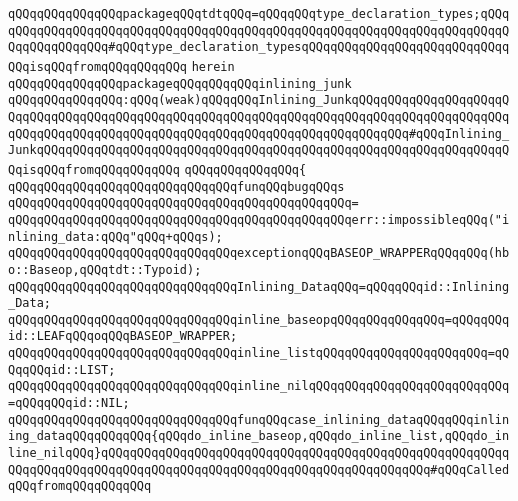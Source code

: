 \verb|qQQqqQQqqQQqqQQqpackageqQQqtdtqQQq=qQQqqQQqtype_declaration_types;qQQqqQQqqQQqqQQqqQQqqQQqqQQqqQQqqQQqqQQqqQQqqQQqqQQqqQQqqQQqqQQqqQQqqQQqqQQqqQQqqQQqqQQq#qQQqtype_declaration_typesqQQqqQQqqQQqqQQqqQQqqQQqqQQqqQQqisqQQqfromqQQqqQQqqQQq|\newline
\verb|herein|\newline
\newline
\verb|qQQqqQQqqQQqqQQqpackageqQQqqQQqqQQqinlining_junk|\newline
\verb|qQQqqQQqqQQqqQQq:qQQq(weak)qQQqqQQqInlining_JunkqQQqqQQqqQQqqQQqqQQqqQQqqQQqqQQqqQQqqQQqqQQqqQQqqQQqqQQqqQQqqQQqqQQqqQQqqQQqqQQqqQQqqQQqqQQqqQQqqQQqqQQqqQQqqQQqqQQqqQQqqQQqqQQqqQQqqQQqqQQqqQQqqQQq#qQQqInlining_JunkqQQqqQQqqQQqqQQqqQQqqQQqqQQqqQQqqQQqqQQqqQQqqQQqqQQqqQQqqQQqqQQqqQQqisqQQqfromqQQqqQQqqQQq|\newline
\verb|qQQqqQQqqQQqqQQq{|\newline
\verb|qQQqqQQqqQQqqQQqqQQqqQQqqQQqqQQqfunqQQqbugqQQqs|\newline
\verb|qQQqqQQqqQQqqQQqqQQqqQQqqQQqqQQqqQQqqQQqqQQqqQQq=|\newline
\verb|qQQqqQQqqQQqqQQqqQQqqQQqqQQqqQQqqQQqqQQqqQQqqQQqerr::impossibleqQQq("inlining_data:qQQq"qQQq+qQQqs);|\newline
\newline
\verb|qQQqqQQqqQQqqQQqqQQqqQQqqQQqqQQqexceptionqQQqBASEOP_WRAPPERqQQqqQQq(hbo::Baseop,qQQqtdt::Typoid);|\newline
\newline
\verb|qQQqqQQqqQQqqQQqqQQqqQQqqQQqqQQqInlining_DataqQQq=qQQqqQQqid::Inlining_Data;|\newline
\newline
\verb|qQQqqQQqqQQqqQQqqQQqqQQqqQQqqQQqinline_baseopqQQqqQQqqQQqqQQq=qQQqqQQqid::LEAFqQQqoqQQqBASEOP_WRAPPER;|\newline
\verb|qQQqqQQqqQQqqQQqqQQqqQQqqQQqqQQqinline_listqQQqqQQqqQQqqQQqqQQqqQQq=qQQqqQQqid::LIST;|\newline
\verb|qQQqqQQqqQQqqQQqqQQqqQQqqQQqqQQqinline_nilqQQqqQQqqQQqqQQqqQQqqQQqqQQq=qQQqqQQqid::NIL;|\newline
\newline
\verb|qQQqqQQqqQQqqQQqqQQqqQQqqQQqqQQqfunqQQqcase_inlining_dataqQQqqQQqinlining_dataqQQqqQQqqQQq{qQQqdo_inline_baseop,qQQqdo_inline_list,qQQqdo_inline_nilqQQq}qQQqqQQqqQQqqQQqqQQqqQQqqQQqqQQqqQQqqQQqqQQqqQQqqQQqqQQqqQQqqQQqqQQqqQQqqQQqqQQqqQQqqQQqqQQqqQQqqQQqqQQqqQQqqQQqqQQq#qQQqCalledqQQqfromqQQqqQQqqQQq|\newline
